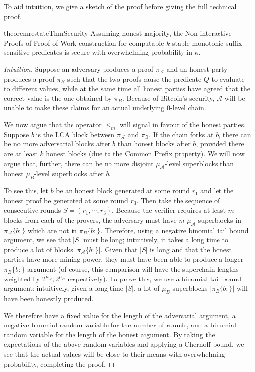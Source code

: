 To aid intuition, we give a sketch of the proof
before giving the full technical proof.

\begin{restatable}[Security]{theorem}{restateThmSecurity}
    \label{thm.security}
    Assuming honest majority, the Non-interactive Proofs of Proof-of-Work
    construction for computable $k$-stable monotonic suffix-sensitive predicates
    is secure with overwhelming probability in $\kappa$.
\end{restatable}
\begin{proof}[Intuition]
Suppose an adversary produces a proof $\pi_\mathcal{A}$ and an honest
party produces a proof $\pi_B$ such that the two proofs cause the predicate $Q$
to evaluate to different values, while at the same time all honest parties have
agreed that the correct value is the one obtained by $\pi_B$. Because of
Bitcoin's security, $\mathcal{A}$ will be unable to make these claims for an
actual underlying 0-level chain.

We now argue that the operator $\leq_m$ will
signal in favour of the honest parties.
Suppose $b$ is the LCA block between $\pi_\mathcal{A}$ and $\pi_B$. If the chain
forks at $b$, there can be no more adversarial blocks after $b$ than honest
blocks after $b$, provided there are at least $k$ honest blocks (due to the
Common Prefix property). We will now argue that, further, there can be no more
disjoint $\mu_\mathcal{A}$-level superblocks than honest $\mu_B$-level
superblocks after $b$.

To see this, let $b$ be an honest block generated at some round $r_1$ and let
the honest proof be generated at some round $r_3$. Then take the sequence
of consecutive rounds $S = (r_1, \cdots, r_3)$. Because the verifier requires at
least $m$ blocks from each of the provers, the adversary must have $m$
$\mu_\mathcal{A}$-superblocks in $\pi_\mathcal{A}\{b:\}$ which are not in
$\pi_B\{b:\}$. Therefore, using a negative binomial tail bound argument, we see
that $|S|$ must be long; intuitively, it takes a long time to produce a lot of
blocks $|\pi_\mathcal{A}\{b:\}|$. Given that $|S|$ is long and that the honest
parties have more mining power, they must have been able to produce a longer
$\pi_B\{b:\}$ argument (of course, this comparison will have the superchain
lengths weighted by $2^{\mu_\mathcal{A}}, 2^{\mu_B}$ respectively). To prove
this, we use a binomial tail bound argument; intuitively, given a long time
$|S|$, a lot of $\mu_B$-superblocks $|\pi_B\{b:\}|$ will have been honestly
produced.

We therefore have a fixed value for the length of the adversarial argument, a
negative binomial random variable for the number of rounds, and a binomial
random variable for the length of the honest argument. By taking the
expectations of the above random variables and applying a Chernoff bound, we see
that the actual values will be close to their means with overwhelming
probability, completing the proof.
\end{proof}

